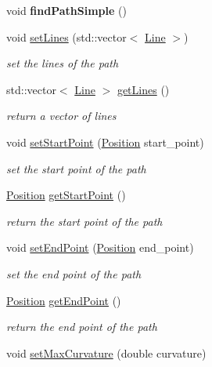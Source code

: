 \begin{DoxyCompactItemize}
void {\bfseries find\+Path\+Simple} ()
\item 
\mbox{\label{class_path_ae5b5816b3480e9f103079bb3467dc65f}} 
void \mbox{\hyperlink{class_path_ae5b5816b3480e9f103079bb3467dc65f}{set\+Lines}} (std\+::vector$<$ \mbox{\hyperlink{class_line}{Line}} $>$)
\begin{DoxyCompactList}\small\item\em set the lines of the path \end{DoxyCompactList}\item 
std\+::vector$<$ \mbox{\hyperlink{class_line}{Line}} $>$ \mbox{\hyperlink{class_path_aff0072e2e1cf183ba6fc240cd85045e2}{get\+Lines}} ()
\begin{DoxyCompactList}\small\item\em return a vector of lines \end{DoxyCompactList}\item 
void \mbox{\hyperlink{class_path_a87f4082a3c5af3aa37260cb99c605156}{set\+Start\+Point}} (\mbox{\hyperlink{class_position}{Position}} start\+\_\+point)
\begin{DoxyCompactList}\small\item\em set the start point of the path \end{DoxyCompactList}\item 
\mbox{\hyperlink{class_position}{Position}} \mbox{\hyperlink{class_path_a88e537e6bfe6140d00b0f36ca642a4cd}{get\+Start\+Point}} ()
\begin{DoxyCompactList}\small\item\em return the start point of the path \end{DoxyCompactList}\item 
void \mbox{\hyperlink{class_path_a168f515818fd9b26a6264fdf95af52e8}{set\+End\+Point}} (\mbox{\hyperlink{class_position}{Position}} end\+\_\+point)
\begin{DoxyCompactList}\small\item\em set the end point of the path \end{DoxyCompactList}\item 
\mbox{\hyperlink{class_position}{Position}} \mbox{\hyperlink{class_path_ac2617080c944b93f7c0c63f3e59aa88c}{get\+End\+Point}} ()
\begin{DoxyCompactList}\small\item\em return the end point of the path \end{DoxyCompactList}\item 
void \mbox{\hyperlink{class_path_a132d54dc6350d1c2eb86611db60df7ff}{set\+Max\+Curvature}} (double curvature)

\end{DoxyCompactItemize}
